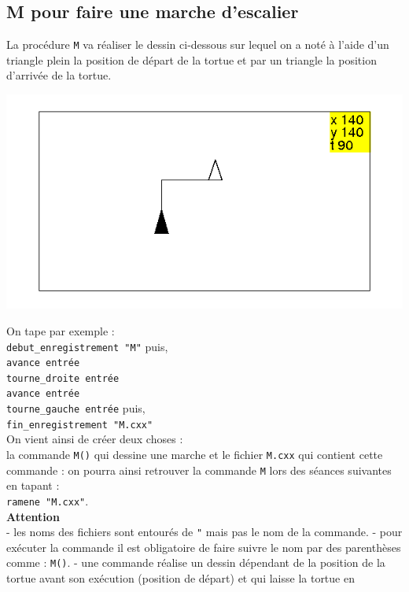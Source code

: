 \documentclass[a4paper,11pt]{book}
\begin{document}
\subsection{M pour faire une marche d'escalier}
La proc\'edure {\tt M} va r\'ealiser le dessin ci-dessous sur lequel on a 
not\'e \`a l'aide d'un triangle plein la position de d\'epart de la tortue et
 par un triangle la position d'arriv\'ee de la tortue.
\begin{center}\includegraphics[width=\textwidth]{tortuem}\end{center}
On tape par exemple :\\
{\tt debut\_enregistrement "M"} puis,\\
{\tt avance entr\'ee}\\
{\tt tourne\_droite entr\'ee}\\ 
{\tt avance entr\'ee}\\
{\tt tourne\_gauche entr\'ee} puis,\\
{\tt fin\_enregistrement "M.cxx"}\\
On vient ainsi de cr\'eer deux choses :\\
la commande {\tt M()} qui dessine une marche et le fichier {\tt M.cxx} qui 
contient cette commande : on pourra ainsi retrouver la commande {\tt M} lors des s\'eances suivantes en tapant :\\
{\tt ramene "M.cxx"}.\\
 {\bf Attention} \\
- les noms des fichiers sont entour\'es de {\tt "} mais pas 
le nom de la commande.
- pour ex\'ecuter la commande il est obligatoire de faire suivre le nom par des
 parenth\`eses comme : {\tt M()}.
- une commande r\'ealise un dessin d\'ependant de la position de la tortue
avant son ex\'ecution (position de d\'epart) et qui laisse la tortue en 
\end{document}
